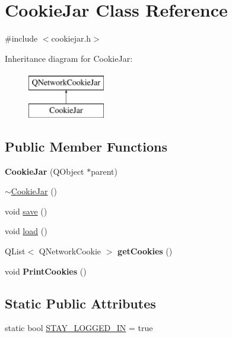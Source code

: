 \hypertarget{classCookieJar}{\section{Cookie\-Jar Class Reference}
\label{classCookieJar}
}


{\ttfamily \#include $<$cookiejar.\-h$>$}

Inheritance diagram for Cookie\-Jar\-:\begin{figure}[H]
\begin{center}
\leavevmode
\includegraphics[height=2.000000cm]{classCookieJar}
\end{center}
\end{figure}
\subsection*{Public Member Functions}
\begin{DoxyCompactItemize}
\item 
\hypertarget{classCookieJar_a9d8362bfcc4d3fb2c5317de3305635a7}{{\bfseries Cookie\-Jar} (Q\-Object $\ast$parent)}\label{classCookieJar_a9d8362bfcc4d3fb2c5317de3305635a7}

\item 
\hyperlink{classCookieJar_ada1a5607a27433955f2b985c6d10bd0a}{$\sim$\-Cookie\-Jar} ()
\item 
void \hyperlink{classCookieJar_aa36822f501cf36baf4984ce9920bfb75}{save} ()
\item 
void \hyperlink{classCookieJar_ab58f94721665cfcf1eb24b140abe53f8}{load} ()
\item 
\hypertarget{classCookieJar_aa887fb809d2206d4d03e623310fba49a}{Q\-List$<$ Q\-Network\-Cookie $>$ {\bfseries get\-Cookies} ()}\label{classCookieJar_aa887fb809d2206d4d03e623310fba49a}

\item 
\hypertarget{classCookieJar_ac2659e9f1aca758ba2b56bbde81a6e21}{void {\bfseries Print\-Cookies} ()}\label{classCookieJar_ac2659e9f1aca758ba2b56bbde81a6e21}

\end{DoxyCompactItemize}
\subsection*{Static Public Attributes}
\begin{DoxyCompactItemize}
\item 
static bool \hyperlink{classCookieJar_a73f0b1e75f689e85ab833b0f1d680827}{S\-T\-A\-Y\-\_\-\-L\-O\-G\-G\-E\-D\-\_\-\-I\-N} = true
\end{DoxyCompactItemize}


